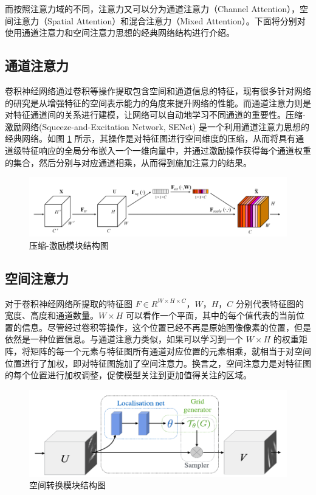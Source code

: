 而按照注意力域的不同，注意力又可以分为通道注意力（Channel Attention），空间注意力（Spatial Attention）和混合注意力（Mixed Attention）。下面将分别对使用通道注意力和空间注意力思想的经典网络结构进行介绍。

\newpage

\subsection{通道注意力}

卷积神经网络通过卷积等操作提取包含空间和通道信息的特征，现有很多针对网络的研究是从增强特征的空间表示能力的角度来提升网络的性能。而通道注意力则是对特征通道间的关系进行建模，让网络可以自动地学习不同通道的重要性。压缩-激励网络(Squeeze-and-Excitation Network, SENet) \cite{DBLP:conf/cvpr/HuSS18} 是一个利用通道注意力思想的经典网络。如图 \ref{fig:fig2-11} 所示，其操作是对特征图进行空间维度的压缩，从而将具有通道级特征响应的全局分布嵌入一个一维向量中，并通过激励操作获得每个通道权重的集合，然后分别与对应通道相乘，从而得到施加注意力的结果。

\begin{figure}[!htbp]
	\centering
	\includegraphics[scale=0.98]{figures/12.png}
	\caption{压缩-激励模块结构图}
	\label{fig:fig2-11}
\end{figure}

\subsection{空间注意力}

对于卷积神经网络所提取的特征图 $F\in R^{W\times H\times C}$，$W$，$H$，$C$ 分别代表特征图的宽度、高度和通道数量。$W\times H$ 可以看作一个平面，其中的每个值代表的当前位置的信息。尽管经过卷积等操作，这个位置已经不再是原始图像像素的位置，但是依然是一种位置信息。与通道注意力类似，如果可以学习到一个 $W\times H$ 的权重矩阵，将矩阵的每一个元素与特征图所有通道对应位置的元素相乘，就相当于对空间位置进行了加权，即对特征图施加了空间注意力。换言之，空间注意力是对特征图的每个位置进行加权调整，促使模型关注到更加值得关注的区域。

\begin{figure}[!htbp]
	\centering
	\includegraphics[scale=0.95]{figures/13.png}
	\caption{空间转换模块结构图}
	\label{fig:fig2-12}
\end{figure}

